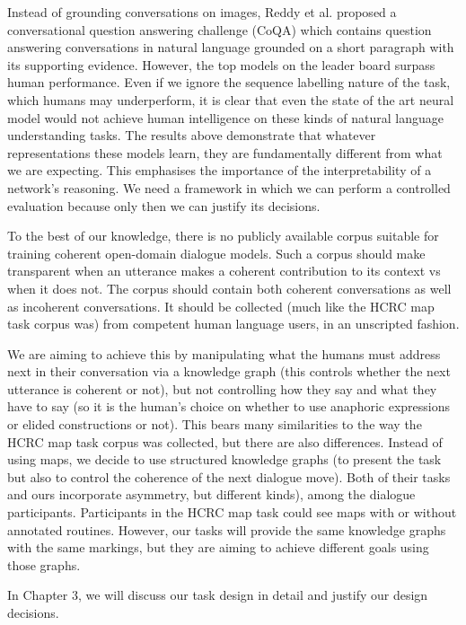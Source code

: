 \documentclass[bsc,frontabs,twoside,singlespacing,parskip,deptreport]{infthesis}     %
\begin{document}
Instead of grounding conversations on images, Reddy et al. \cite{reddy2019coqa} proposed a conversational question answering challenge (CoQA) which contains question answering conversations in natural language grounded on a short paragraph with its supporting evidence. However, the top models on the leader board surpass human performance. Even if we ignore the sequence labelling nature of the task, which humans may underperform, it is clear that even the state of the art neural model would not achieve human intelligence on these kinds of natural language understanding tasks. The results above demonstrate that whatever representations these models learn, they are fundamentally different from what we are expecting. This emphasises the importance of the interpretability of a network's reasoning. We need a framework in which we can perform a controlled evaluation because only then we can justify its decisions.

To the best of our knowledge, there is no publicly available corpus suitable for training coherent open-domain dialogue models. Such a corpus should make transparent when an utterance makes a coherent contribution to its context vs when it does not. The corpus should contain both coherent conversations as well as incoherent conversations. It should be collected (much like the HCRC map task corpus was) from competent human language users, in an unscripted fashion.

We are aiming to achieve this by manipulating what the humans must address next in their conversation via a knowledge graph (this controls whether the next utterance is coherent or not), but not controlling how they say and what they have to say (so it is the human's choice on whether to use anaphoric expressions or elided constructions or not). This bears many similarities to the way the HCRC map task corpus was collected, but there are also differences. Instead of using maps, we decide to use structured knowledge graphs (to present the task but also to control the coherence of the next dialogue move). Both of their tasks and ours incorporate asymmetry, but different kinds), among the dialogue participants. Participants in the HCRC map task could see maps with or without annotated routines. However, our tasks will provide the same knowledge graphs with the same markings, but they are aiming to achieve different goals using those graphs.

In Chapter 3, we will discuss our task design in detail and justify our design decisions. 
\end{document}
